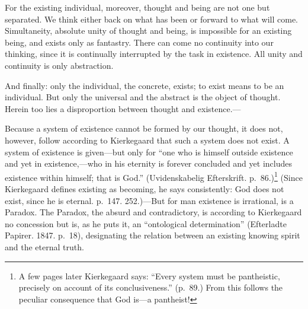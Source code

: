 \documentclass[12pt,a4paper]{book}
\newcommand{\opage}[1]{\marginnote{\footnotesize\textit{[#1]}}}
\begin{document}
For the existing individual, moreover, thought and being are not one but
separated. We think either back on what has been or forward to what will
come. Simultaneity, absolute unity of thought and being, is impossible
for an existing being, and exists only as fantastry. There can come no
continuity into our thinking, since it is continually interrupted by the
task in existence. All unity and continuity is only abstraction.

And finally: only the individual, the concrete, exists; to exist means to
be an individual. But only the universal and the abstract is the object
of thought. Herein too lies a disproportion between thought and
existence.---

Because a system of existence cannot be formed by our thought, it does
not, however, follow according to Kierkegaard that such a system does not
exist. A system of existence is given---but only for ``one who is
himself outside existence and yet in existence,---who in his eternity is
forever concluded and yet includes existence within himself; that is
God.''
(Uvidenskabelig Efterskrift.
\opage{64}p.~86.)\footnote{A few pages later Kierkegaard says: ``Every system
must be pantheistic, precisely on account of its conclusiveness.''
(p.~89.) From this follows the peculiar consequence that God is---a
pantheist!} (Since Kierkegaard defines existing as becoming, he says
consistently: God does not exist, since he is eternal. p.~147. 252.)---But
for man existence is irrational, is a Paradox. The Paradox, the absurd
and contradictory, is according to Kierkegaard no concession but is, as
he puts it, an ``ontological determination'' (Efterladte Papirer. 1847.
p.~18), designating the relation between an existing knowing spirit and
the eternal truth.
\end{document}
